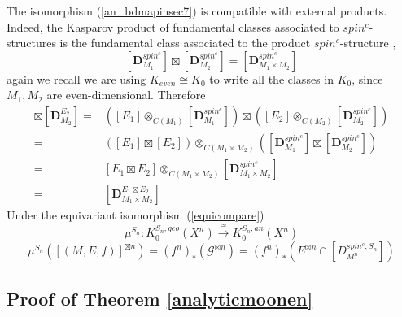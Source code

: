 \documentclass[11pt,leqno,twoside]{amsart}
\theoremstyle{plainsl}
\theoremstyle{definition}
\newcommand{\bD}{\mathbf{D}}
\begin{document}
 The isomorphism (\ref{an_bdmapinsec7}) is compatible with external products. Indeed, the Kasparov product of fundamental classes associated to $spin^c$-structures is the fundamental class associated to the product $spin^c$-structure \cite[Prop.~11.2.13]{HR},
 \[[\bD^{spin^c}_{M_1}]\boxtimes [\bD^{spin^c}_{M_2}]=[\bD^{spin^c}_{M_1\times M_2}]\]
 again we recall we are using  $K_{even}\cong K_0$ to write all the classes in $K_0$, since $M_1,M_2$ are even-dimensional. Therefore
\begin{align*}
    [\bD^{E_1}_{M_1}]\boxtimes [\bD^{E_2}_{M_2}]=&([E_1]\otimes_{C(M_1)}[\bD_{M_1}^{spin^c}]) \boxtimes ([E_2]\otimes_{C(M_2)}[\bD_{M_2}^{spin^c}])\\
    =&([E_1]\boxtimes[E_2] )\otimes_{C(M_1\times M_2)} ([\bD^{spin^c}_{M_1}]\boxtimes [\bD^{spin^c}_{M_2}])\\
    =& [E_1\boxtimes E_2] \otimes_{C(M_1\times M_2)} [\bD^{spin^c}_{M_1\times M_2}]\\
    =&[\bD^{E_1\boxtimes E_2}_{M_1\times M_2}]
\end{align*}
 Under the equivariant isomorphism (\ref{equicompare})
 \[\mu^{S_n}:K_0^{S_n,geo}(X^n) \xrightarrow{\cong} K_0^{S_n,an}(X^n) \]
\[\mu^{S_n}([(M,E,f)]^{\boxtimes n})=(f^n)_*(\mathcal{G}^{\boxtimes n})=(f^n)_*(E^{\boxtimes n}\cap[D_{M^n}^{spin^c,S_n}])\]





\subsection{Proof of Theorem \ref{analyticmoonen}}
\end{document}

